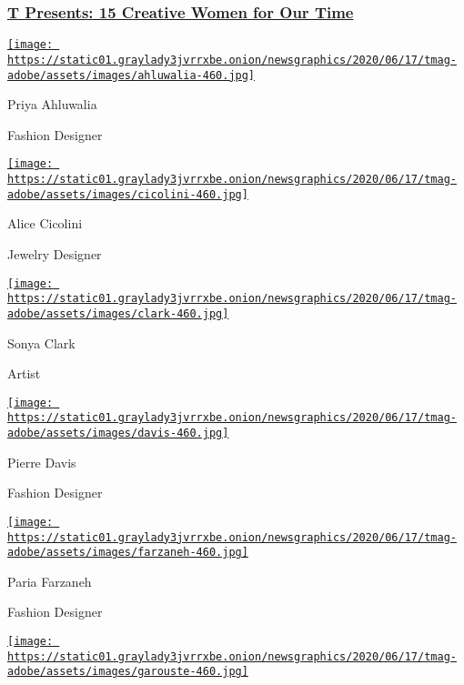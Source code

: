 \hypertarget{t-presents-15-creative-women-for-our-time}{%
\subsubsection{\texorpdfstring{\href{https://www.nytimes3xbfgragh.onion/interactive/2020/08/10/t-magazine/creative-women-designers-artists-chefs.html}{T
Presents: 15 Creative Women for Our
Time}}{T Presents: 15 Creative Women for Our Time}}\label{t-presents-15-creative-women-for-our-time}}

\href{https://www.nytimes3xbfgragh.onion/section/t-magazine}{}

\href{https://www.nytimes3xbfgragh.onion/2020/08/10/t-magazine/priya-ahluwalia-fashion-menswear.html}{\texttt{[image: https://static01.graylady3jvrrxbe.onion/newsgraphics/2020/06/17/tmag-adobe/assets/images/ahluwalia-460.jpg]}}

Priya Ahluwalia

Fashion Designer

\href{https://www.nytimes3xbfgragh.onion/2020/08/10/t-magazine/alice-cicolini-jewelry-art.html}{\texttt{[image: https://static01.graylady3jvrrxbe.onion/newsgraphics/2020/06/17/tmag-adobe/assets/images/cicolini-460.jpg]}}

Alice Cicolini

Jewelry Designer

\href{https://nytimes3xbfgragh.onion/2020/08/10/t-magazine/sonya-clark-flags-art.html}{\texttt{[image: https://static01.graylady3jvrrxbe.onion/newsgraphics/2020/06/17/tmag-adobe/assets/images/clark-460.jpg]}}

Sonya Clark

Artist

\href{https://www.nytimes3xbfgragh.onion/2020/08/10/t-magazine/pierre-davis-no-sesso.html}{\texttt{[image: https://static01.graylady3jvrrxbe.onion/newsgraphics/2020/06/17/tmag-adobe/assets/images/davis-460.jpg]}}

Pierre Davis

Fashion Designer

\href{https://www.nytimes3xbfgragh.onion/2020/08/10/t-magazine/paria-farzaneh-fashion-menswear.html}{\texttt{[image: https://static01.graylady3jvrrxbe.onion/newsgraphics/2020/06/17/tmag-adobe/assets/images/farzaneh-460.jpg]}}

Paria Farzaneh

Fashion Designer

\href{https://www.nytimes3xbfgragh.onion/2020/08/10/t-magazine/elizabeth-garouste-interior-design.html}{\texttt{[image: https://static01.graylady3jvrrxbe.onion/newsgraphics/2020/06/17/tmag-adobe/assets/images/garouste-460.jpg]}}

